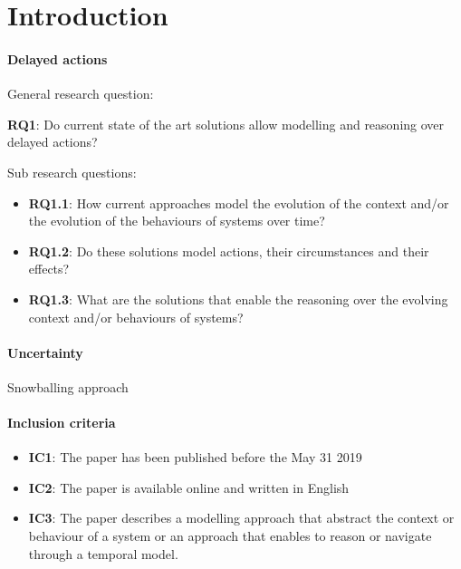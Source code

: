 \section{Introduction}

\paragraph{Delayed actions}
General research question:
\begin{center}
	\textbf{RQ1}: Do current state of the art solutions allow modelling and reasoning over delayed actions?  
\end{center}

Sub research questions:
\begin{itemize}
	\item \textbf{RQ1.1}: How current approaches model the evolution of the context and/or the evolution of the behaviours of systems over time?
	\item \textbf{RQ1.2}: Do these solutions model actions, their circumstances and their effects?
	\item \textbf{RQ1.3}: What are the solutions that enable the reasoning over the evolving context and/or behaviours of systems?
\end{itemize}


\paragraph{Uncertainty}

Snowballing approach~\cite{DBLP:conf/ease/Wohlin14}

\paragraph{Inclusion criteria}
\begin{itemize}
	\item \textbf{IC1}: The paper has been published before the May 31 2019
	\item \textbf{IC2}: The paper is available online and written in English
	\item \textbf{IC3}: The paper describes a modelling approach that abstract the context or behaviour of a system or an approach that enables to reason or navigate through a temporal model.
\end{itemize}

